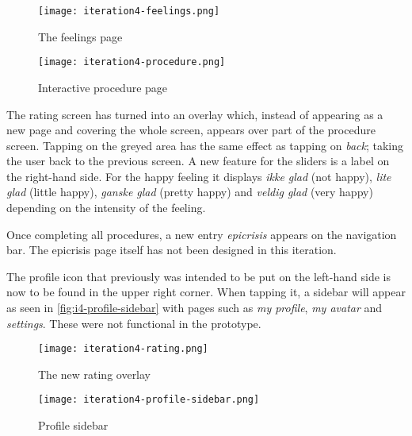 \begin{sidewaysfigure}
    \centering
    \hspace{\fill}
    \begin{minipage}{0.4\textwidth}
        \centering
        \texttt{[image: iteration4-feelings.png]}
        \caption{The feelings page}
        \label{fig:i4-feelings}
    \end{minipage}
    \hspace{\fill}
    \begin{minipage}{0.4\textwidth}
        \centering
        \texttt{[image: iteration4-procedure.png]}
        \caption{Interactive procedure page}
        \label{fig:i4-procedure}
    \end{minipage}
    \hspace*{\fill}
\end{sidewaysfigure}

The rating screen has turned into an overlay which, instead of appearing as a new page and covering the whole screen, appears over part of the procedure screen. Tapping on the greyed area has the same effect as tapping on \emph{back}; taking the user back to the previous screen. A new feature for the sliders is a label on the right-hand side. For the happy feeling it displays \emph{ikke glad} (not happy), \emph{lite glad} (little happy), \emph{ganske glad} (pretty happy) and \emph{veldig glad} (very happy) depending on the intensity of the feeling.

Once completing all procedures, a new entry \emph{epicrisis} appears on the navigation bar. The epicrisis page itself has not been designed in this iteration.

The profile icon that previously was intended to be put on the left-hand side is now to be found in the upper right corner.
When tapping it, a sidebar will appear as seen in \autoref{fig:i4-profile-sidebar} with pages such as \emph{my profile}, \emph{my avatar} and \emph{settings}. These were not functional in the prototype.

\begin{sidewaysfigure}
    \centering
    \hspace{\fill}
    \begin{minipage}[t]{0.4\textwidth}
        \vspace{0pt}
        \centering
        \texttt{[image: iteration4-rating.png]}
        \caption{The new rating overlay}
        \label{fig:i4-rating}
    \end{minipage}
    \hspace{\fill}
    \begin{minipage}[t]{0.4\textwidth}
        \vspace{0pt}
        \centering
        \texttt{[image: iteration4-profile-sidebar.png]}
        \caption{Profile sidebar}
        \label{fig:i4-profile-sidebar}
    \end{minipage}
    \hspace*{\fill}
\end{sidewaysfigure}

